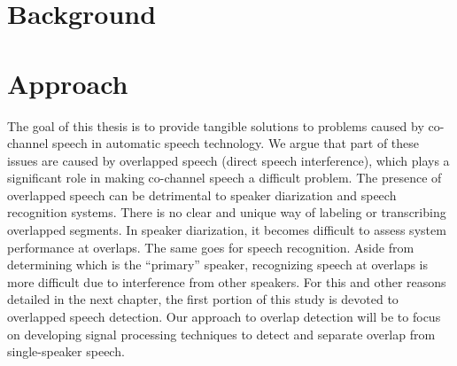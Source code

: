 \section{Background}
\label{sec:background}



\section{Approach}

The goal of this thesis is to provide tangible solutions to problems caused by co-channel speech in automatic speech technology. 
We argue that part of these issues are caused by overlapped speech (direct speech interference), which plays a significant role in making co-channel speech a difficult problem. 
The presence of overlapped speech can be detrimental to speaker diarization and speech recognition systems. 
There is no clear and unique way of labeling or transcribing overlapped segments. 
In speaker diarization, it becomes difficult to assess system performance at overlaps. 
The same goes for speech recognition. 
Aside from determining which is the ``primary'' speaker, recognizing speech at overlaps is more difficult due to interference from other speakers. 
For this and other reasons detailed in the next chapter, the first portion of this study is devoted to overlapped speech detection. 
Our approach to overlap detection will be to focus on developing signal processing techniques to detect and separate overlap from single-speaker speech. 

